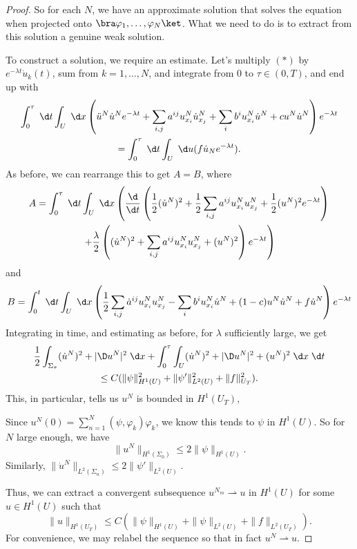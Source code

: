 \documentclass[a4paper]{article}
\begin{document}
\begin{proof}
  So for each $N$, we have an approximate solution that solves the equation when projected onto $\bra \varphi_1, \ldots, \varphi_N\ket$. What we need to do is to extract from this solution a genuine weak solution.

  To construct a solution, we require an estimate. Let's multiply $(*)$ by $e^{-\lambda t} \dot{u}_k(t)$, sum from $k = 1, \ldots, N$, and integrate from $0$ to $\tau \in (0, T)$, and end up with
  \begin{multline*}
    \int_0^\tau \;\d t \int_U \;\d x \left(\ddot{u}^N \dot{u}^N e^{-\lambda t} + \sum_{i, j} a^{ij} u_{x_i}^N \dot{u}_{x_j}^N + \sum_i b^i u_{x_i}^N \dot{u}^N + c u^N \dot{u}^N\right)e^{-\lambda t}\\
    = \int_0^\tau \;\d t \int_U \;\d u (f \dot{u}_N e^{-\lambda t}).
  \end{multline*}
  As before, we can rearrange this to get $A = B$, where
  \begin{multline*}
    A = \int_0^\tau \;\d t \int_U \;\d x \left(\frac{\d}{\d t} \left(\frac{1}{2} (\dot{u}^N)^2 + \frac{1}{2} \sum_{i, j} a^{ij} u_{x_i}^N u_{x_j}^N + \frac{1}{2} (u^N)^2 e^{-\lambda t}\right)\right.\\
    \left.+ \frac{\lambda}{2} \left((\dot{u}^N)^2 + \sum_{i, j} a^{ij} u_{x_i}^N u_{x_j}^N + (u^N)^2 \right)e^{-\lambda t}\right)
  \end{multline*}
  and
  \[
    B = \int_0^t \;\d t \int_U\;\d x\left( \frac{1}{2} \sum_{i, j} \dot{a}^{ij} u_{x_i}^N u_{x_j}^N - \sum_i b^i u_{x_i}^N \dot{u}^N + (1 - c) u^N \dot{u}^N + f \dot{u}^N \right)e^{-\lambda t}
  \]
  Integrating in time, and estimating as before, for $\lambda$ sufficiently large, we get
  \begin{multline*}
    \frac{1}{2} \int_{\Sigma_\tau} (\dot{u}^N)^2 + |\D u^N|^2 \;\d x + \int_0^\tau \int_U (\dot{u}^N)^2 + |\D u^N|^2 + (u^N)^2 \;\d x\;\d t\\
    \leq C (\|\psi\|^2_{H^1(U)} + \|\psi'\|^2_{L^2(U)} + \|f\|_{U_T}^2).
  \end{multline*}
  This, in particular, tells us $u^N$ is bounded in $H^1(U_T)$,

  Since $u^N(0) = \sum_{n = 1}^N (\psi, \varphi_k) \varphi_k$, we know this tends to $\psi$ in $H^1(U)$. So for $N$ large enough, we have
  \[
    \|u^N\|_{H^1(\Sigma_0)} \leq 2 \|\psi\|_{H^1(U)}.
  \]
  Similarly, $\|\dot{u}^N\|_{L^2(\Sigma_n)} \leq 2 \|\psi'\|_{L^2(U)}$.

  Thus, we can extract a convergent subsequence $u^{N_m} \rightharpoonup u$ in $H^1(U)$ for some $u \in H^1(U)$ such that %
  \[
    \|u\|_{H^1(U_T)} \leq C (\|\psi\|_{H^1(U)} + \|\psi\|_{L^2(U)} + \|f\|_{L^2(U_T)}).
  \]
  For convenience, we may relabel the sequence so that in fact $u^N \rightharpoonup u$.


\end{proof}
\end{document}
